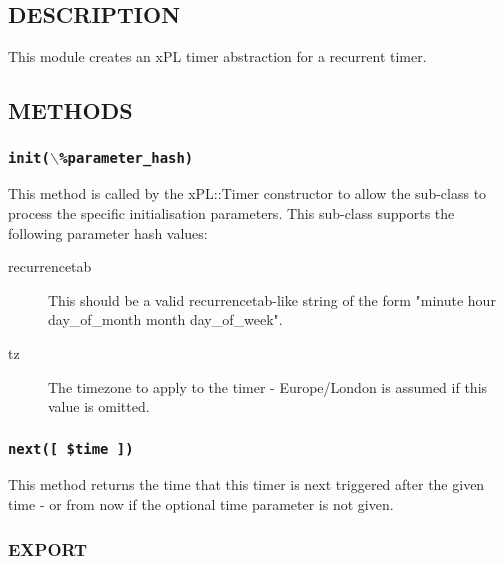 \documentclass[12pt,a4paper]{article}
\begin{document}
\subsection*{DESCRIPTION\label{xPL::Timer::recurrence_DESCRIPTION}}


This module creates an xPL timer abstraction for a recurrent timer.

\subsection*{METHODS\label{xPL::Timer::recurrence_METHODS}}
\subsubsection*{\texttt{init($\backslash$\%parameter\_hash)}\label{xPL::Timer::recurrence_init_backslash_parameter_hash_}}


This method is called by the xPL::Timer constructor to allow the
sub-class to process the specific initialisation parameters.  This
sub-class supports the following parameter hash values:

\begin{description}

\item[{recurrencetab}] \mbox{}

This should be a valid recurrencetab-like string of the form
"minute hour day\_of\_month month day\_of\_week".


\item[{tz}] \mbox{}

The timezone to apply to the timer - Europe/London is assumed if this
value is omitted.

\end{description}
\subsubsection*{\texttt{next([ \$time ])}\label{xPL::Timer::recurrence_next_time_}}


This method returns the time that this timer is next triggered after
the given time - or from now if the optional time parameter is not
given.

\subsubsection*{EXPORT\label{xPL::Timer::recurrence_EXPORT}}
\end{document}
